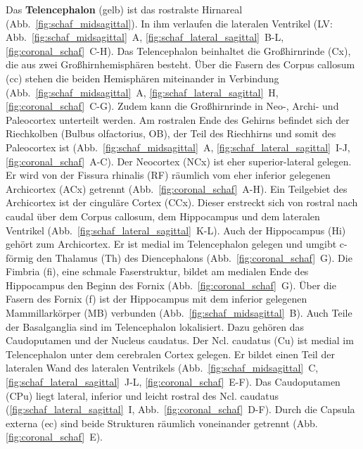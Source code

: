 \documentclass[12pt,a4paper,pdftex]{article}
\begin{document}
Das \textbf{Telencephalon} (gelb) ist das rostralste Hirnareal (Abb.~\ref{fig:schaf_midsagittal}). In ihm verlaufen die lateralen Ventrikel (LV: Abb.~\ref{fig:schaf_midsagittal}~A, \ref{fig:schaf_lateral_sagittal}~B-L, \ref{fig:coronal_schaf}~C-H). Das Telencephalon beinhaltet die Großhirnrinde (Cx), die aus zwei Großhirnhemisphären besteht. Über die Fasern des Corpus callosum (cc) stehen die beiden Hemisphären miteinander in Verbindung (Abb.~\ref{fig:schaf_midsagittal}~A, \ref{fig:schaf_lateral_sagittal}~H, \ref{fig:coronal_schaf}~C-G). Zudem kann die Großhirnrinde in Neo-, Archi- und Paleocortex unterteilt werden. Am rostralen Ende des Gehirns befindet sich der Riechkolben (Bulbus olfactorius, OB), der Teil des Riechhirns und somit des Paleocortex ist (Abb.~\ref{fig:schaf_midsagittal}~A, \ref{fig:schaf_lateral_sagittal}~I-J,
\ref{fig:coronal_schaf}~A-C). Der Neocortex (NCx) ist eher superior-lateral gelegen. Er wird von der Fissura rhinalis (RF) räumlich vom eher inferior gelegenen Archicortex (ACx) getrennt (Abb.~\ref{fig:coronal_schaf}~A-H). Ein Teilgebiet des Archicortex ist der cinguläre Cortex (CCx). Dieser erstreckt sich von rostral nach caudal über dem Corpus callosum, dem Hippocampus und dem lateralen Ventrikel (Abb.~\ref{fig:schaf_lateral_sagittal}~K-L). Auch der Hippocampus (Hi) gehört zum Archicortex. Er ist medial im Telencephalon gelegen und umgibt c-förmig den Thalamus (Th) des Diencephalons (Abb.~\ref{fig:coronal_schaf}~G). Die Fimbria (fi), eine schmale Faserstruktur, bildet am medialen Ende des Hippocampus den Beginn des Fornix (Abb.~\ref{fig:coronal_schaf}~G). Über die Fasern des Fornix (f) ist der Hippocampus mit dem inferior gelegenen Mammillarkörper (MB) verbunden (Abb.~\ref{fig:schaf_midsagittal}~B). Auch Teile der Basalganglia sind im Telencephalon lokalisiert. Dazu gehören das Caudoputamen und der Nucleus caudatus. Der Ncl. caudatus (Cu) ist medial im Telencephalon unter dem cerebralen Cortex gelegen. Er bildet einen Teil der lateralen Wand des lateralen Ventrikels (Abb.~\ref{fig:schaf_midsagittal}~C, \ref{fig:schaf_lateral_sagittal}~J-L, \ref{fig:coronal_schaf}~E-F). Das Caudoputamen (CPu) liegt lateral, inferior und leicht rostral des Ncl. caudatus (\ref{fig:schaf_lateral_sagittal}~I, Abb.~\ref{fig:coronal_schaf}~D-F). Durch die Capsula externa (ec) sind beide Strukturen räumlich voneinander getrennt (Abb.\ref{fig:coronal_schaf}~E).
\end{document}

